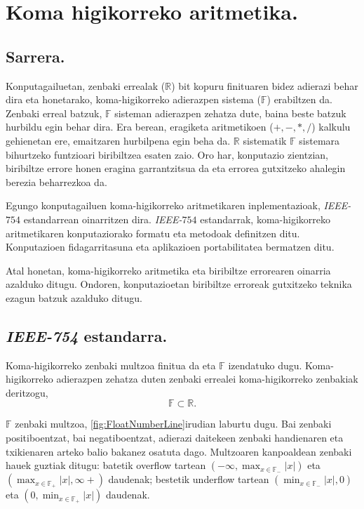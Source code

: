 \chapter{Koma higikorreko aritmetika.}
\label{sec:4}

\section{Sarrera.}

Konputagailuetan, zenbaki errealak ($\mathbb{R}$) bit kopuru finituaren bidez adierazi behar dira eta honetarako, koma-higikorreko adierazpen sistema ($\mathbb{F}$) erabiltzen da. Zenbaki erreal batzuk, $\mathbb{F}$ sisteman adierazpen zehatza dute, baina beste batzuk hurbildu egin behar dira.  Era berean, eragiketa aritmetikoen ($+,-,*,/$) kalkulu gehienetan ere, emaitzaren hurbilpena egin beha da. $\mathbb{R}$ sistematik $\mathbb{F}$ sistemara bihurtzeko funtzioari biribiltzea esaten zaio. Oro har, konputazio zientzian, biribiltze errore honen eragina garrantzitsua da eta errorea gutxitzeko ahalegin berezia beharrezkoa da.

Egungo konputagailuen koma-higikorreko aritmetikaren inplementazioak, \emph{IEEE-$754$} estandarrean \cite{IEEE2008} oinarritzen dira. 
\emph{IEEE-$754$} estandarrak, koma-higikorreko aritmetikaren konputaziorako formatu eta metodoak definitzen ditu. Konputazioen fidagarritasuna eta aplikazioen portabilitatea bermatzen ditu.    
 
Atal honetan, koma-higikorreko aritmetika eta biribiltze errorearen oinarria azalduko ditugu. Ondoren, konputazioetan biribiltze erroreak gutxitzeko teknika ezagun batzuk azalduko ditugu. 

\section{\emph{IEEE-754} estandarra.}

Koma-higikorreko zenbaki multzoa finitua da eta ${\mathbb{F}}$ izendatuko dugu. Koma-higikorreko adierazpen zehatza duten zenbaki errealei koma-higikorreko zenbakiak deritzogu, 
\begin{equation*}
\mathbb{F}\subset \mathbb{R}.
\end{equation*}

$\mathbb{F}$ zenbaki multzoa, \ref{fig:FloatNumberLine}irudian laburtu dugu. Bai zenbaki positiboentzat, bai negatiboentzat, adierazi daitekeen zenbaki handienaren eta txikienaren arteko balio bakanez osatuta dago. Multzoaren kanpoaldean zenbaki hauek guztiak ditugu: batetik overflow tartean $(-\infty,\max_{x \in \mathbb{F_{-}}}|x|)$  eta $(\max_{x \in \mathbb{F_{+}}}|x|,\infty+)$ daudenak; bestetik underflow tartean  $(\min_{x \in \mathbb{F_{-}}}|x|,0)$ eta $(0,\min_{x \in \mathbb{F_{+}}}|x|)$ daudenak. 

